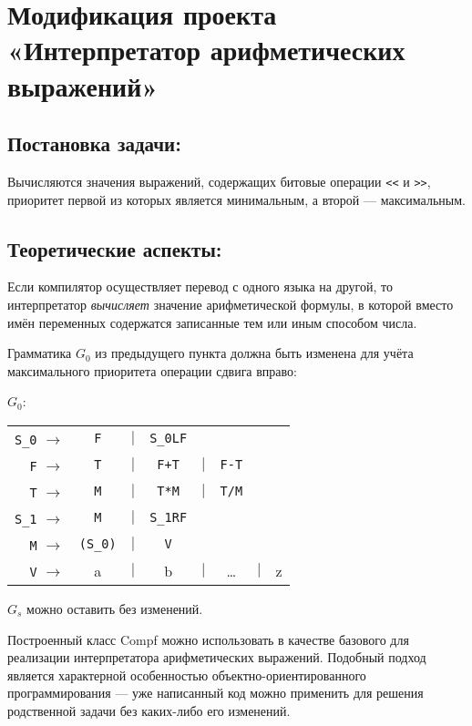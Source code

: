 \section{Модификация проекта «Интерпретатор арифметических выражений»}

\subsection{Постановка задачи:}
Вычисляются значения выражений, содержащих битовые операции  \verb|<<| и \verb|>>|,
приоритет первой из которых является минимальным, а второй — максимальным.

\subsection{Теоретические аспекты:}
Если компилятор осуществляет перевод с одного языка на другой, то интерпретатор
\emph{вычисляет} значение арифметической формулы, в которой вместо имён переменных
содержатся записанные тем или иным способом числа.

Грамматика $G_0$ из предыдущего пункта должна быть изменена для учёта максимального приоритета операции сдвига вправо:

$G_0$:
\medskip
\noindent\hspace{2cm}
\begin{tabular}{rcccccll}
\verb|S_0| $\rightarrow$ & \verb|F| &$\mid$&\verb|S_0LF|\\
\verb|F| $\rightarrow$ & \verb|T| &$\mid$&\verb|F+T|&$\mid$&\verb|F-T|\\
\verb|T| $\rightarrow$ & \verb|M| &$\mid$&\verb|T*M|&$\mid$&\verb|T/M|\\
\verb|S_1| $\rightarrow$ & \verb|M| &$\mid$& \verb|S_1RF|\\
\verb|M| $\rightarrow$ & \verb|(S_0)|&$\mid$&\verb|V|\\
\verb|V| $\rightarrow$ & a &$\mid$& b &$\mid$& \dots &$\mid$& z\\
\end{tabular}
\medskip


$G_s$ можно оставить без изменений.

Построенный класс Compf можно использовать в качестве базового для реализации
интерпретатора арифметических выражений. Подобный подход является характерной
особенностью объектно-ориентированного программирования — уже написанный код можно
применить для решения родственной задачи без каких-либо его изменений.


